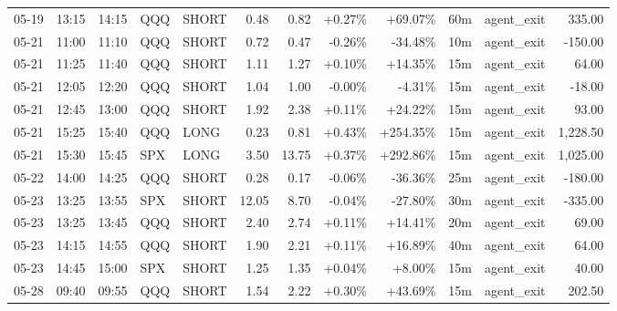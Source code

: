 \documentclass[11pt,a4paper]{article}
\begin{document}
\begin{center}
\begin{longtable}{>{\color{txtmain}}l l l l l r r r r r >{\color{txtmain}}l r}
05-19 & 13:15 & 14:15 & QQQ & SHORT & 0.48 & 0.82 & \textcolor{wingreen}{+0.27\%} & \textcolor{wingreen}{+69.07\%} & 60m & agent\_exit & \textcolor{wingreen}{335.00} \\
05-21 & 11:00 & 11:10 & QQQ & SHORT & 0.72 & 0.47 & \textcolor{lossred}{-0.26\%} & \textcolor{lossred}{-34.48\%} & 10m & agent\_exit & \textcolor{lossred}{-150.00} \\
05-21 & 11:25 & 11:40 & QQQ & SHORT & 1.11 & 1.27 & \textcolor{wingreen}{+0.10\%} & \textcolor{wingreen}{+14.35\%} & 15m & agent\_exit & \textcolor{wingreen}{64.00} \\
05-21 & 12:05 & 12:20 & QQQ & SHORT & 1.04 & 1.00 & \textcolor{wingreen}{-0.00\%} & \textcolor{lossred}{-4.31\%} & 15m & agent\_exit & \textcolor{lossred}{-18.00} \\
05-21 & 12:45 & 13:00 & QQQ & SHORT & 1.92 & 2.38 & \textcolor{wingreen}{+0.11\%} & \textcolor{wingreen}{+24.22\%} & 15m & agent\_exit & \textcolor{wingreen}{93.00} \\
05-21 & 15:25 & 15:40 & QQQ & LONG & 0.23 & 0.81 & \textcolor{wingreen}{+0.43\%} & \textcolor{wingreen}{+254.35\%} & 15m & agent\_exit & \textcolor{wingreen}{1,228.50} \\
05-21 & 15:30 & 15:45 & SPX & LONG & 3.50 & 13.75 & \textcolor{wingreen}{+0.37\%} & \textcolor{wingreen}{+292.86\%} & 15m & agent\_exit & \textcolor{wingreen}{1,025.00} \\
05-22 & 14:00 & 14:25 & QQQ & SHORT & 0.28 & 0.17 & \textcolor{lossred}{-0.06\%} & \textcolor{lossred}{-36.36\%} & 25m & agent\_exit & \textcolor{lossred}{-180.00} \\
05-23 & 13:25 & 13:55 & SPX & SHORT & 12.05 & 8.70 & \textcolor{lossred}{-0.04\%} & \textcolor{lossred}{-27.80\%} & 30m & agent\_exit & \textcolor{lossred}{-335.00} \\
05-23 & 13:25 & 13:45 & QQQ & SHORT & 2.40 & 2.74 & \textcolor{wingreen}{+0.11\%} & \textcolor{wingreen}{+14.41\%} & 20m & agent\_exit & \textcolor{wingreen}{69.00} \\
05-23 & 14:15 & 14:55 & QQQ & SHORT & 1.90 & 2.21 & \textcolor{wingreen}{+0.11\%} & \textcolor{wingreen}{+16.89\%} & 40m & agent\_exit & \textcolor{wingreen}{64.00} \\
05-23 & 14:45 & 15:00 & SPX & SHORT & 1.25 & 1.35 & \textcolor{wingreen}{+0.04\%} & \textcolor{wingreen}{+8.00\%} & 15m & agent\_exit & \textcolor{wingreen}{40.00} \\
05-28 & 09:40 & 09:55 & QQQ & SHORT & 1.54 & 2.22 & \textcolor{wingreen}{+0.30\%} & \textcolor{wingreen}{+43.69\%} & 15m & agent\_exit & \textcolor{wingreen}{202.50} \\

\end{longtable}
\end{center}
\end{document}
